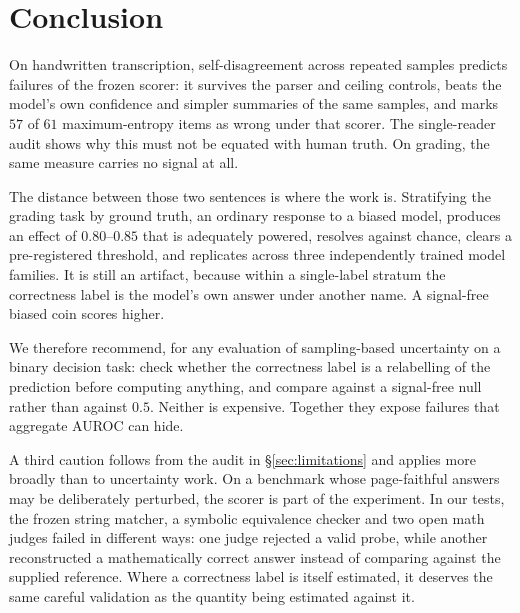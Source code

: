 \documentclass[10pt,twocolumn,letterpaper]{article}
\begin{document}
\section{Conclusion}
On handwritten transcription, self-disagreement across repeated samples
predicts failures of the frozen scorer: it survives the parser and ceiling
controls, beats the model's own confidence and simpler summaries of the same
samples, and marks $57$ of $61$ maximum-entropy items as wrong under that
scorer. The single-reader audit shows why this must not be equated with human
truth. On grading, the same measure carries no signal at all.

The distance between those two sentences is where the work is. Stratifying
the grading task by ground truth, an ordinary response to a biased model,
produces an effect of $0.80$--$0.85$ that is adequately powered,
resolves against chance, clears a pre-registered threshold, and replicates
across three independently trained model families. It is still an
artifact, because within a single-label stratum the correctness label is
the model's own answer under another name. A signal-free biased coin
scores higher.

We therefore recommend, for any evaluation of sampling-based uncertainty
on a binary decision task: check whether the correctness label is a
relabelling of the prediction before computing anything, and compare
against a signal-free null rather than against $0.5$. Neither is
expensive. Together they expose failures that aggregate AUROC can hide.

A third caution follows from the audit in \S\ref{sec:limitations} and
applies more broadly than to uncertainty work. On a benchmark whose
page-faithful answers may be deliberately perturbed, the scorer is part of
the experiment. In our tests, the frozen string matcher, a symbolic
equivalence checker and two open math judges failed in different ways: one
judge rejected a valid probe, while another reconstructed a mathematically
correct answer instead of comparing against the supplied reference. Where
a correctness label is itself estimated, it deserves the same careful
validation as the quantity being estimated against it.

{
    \small
    
    
}
\end{document}
